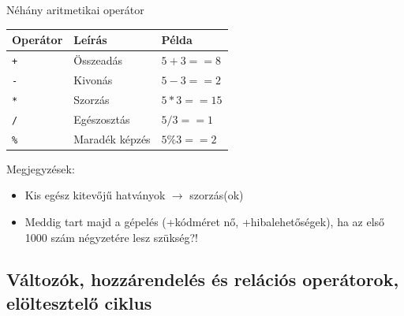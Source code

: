 \documentclass[usenames,dvipsnames,aspectratio=169]{beamer}
\begin{document}
\begin{frame}[fragile]
  Néhány aritmetikai operátor\\
  \begin{center}
    \begin{tabular}{lll}
      Operátor & Leírás & Példa\\ \hline
      \texttt{+} & Összeadás & $5 + 3 == 8$ \\
      \texttt{-} & Kivonás & $5 - 3 == 2$ \\
      \texttt{*} & Szorzás & $5 * 3 == 15$ \\
      \texttt{/} & Egészosztás & $5 / 3 == 1$ \\
      \texttt{\%} & Maradék képzés & $5 \% 3 == 2$ \\
    \end{tabular}
  \end{center}
  Megjegyzések:
  \begin{itemize}
    \item Kis egész kitevőjű hatványok $\rightarrow$ szorzás(ok)
    \item Meddig tart majd a gépelés (+kódméret nő, +hibalehetőségek), ha az első 1000 szám négyzetére lesz szükség?!
  \end{itemize}
\end{frame}

\subsection{Változók, hozzárendelés és relációs operátorok, elöltesztelő ciklus}

\begin{frame}
  \begin{exampleblock}{}
    \vspace{-.2cm}
        
    \vspace{-.2cm}
  \end{exampleblock}
\end{frame}
\end{document}
